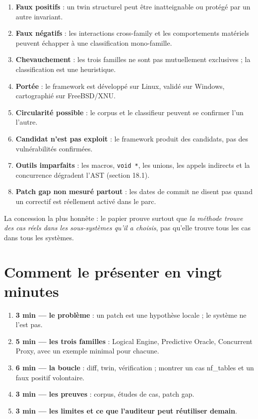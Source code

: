 \documentclass{training}
\begin{document}
\begin{enumerate}
  \item \textbf{Faux positifs} : un twin structurel peut être inatteignable ou
        protégé par un autre invariant.
  \item \textbf{Faux négatifs} : les interactions cross-family et les
        comportements matériels peuvent échapper à une classification
        mono-famille.
  \item \textbf{Chevauchement} : les trois familles ne sont pas mutuellement
        exclusives ; la classification est une heuristique.
  \item \textbf{Portée} : le framework est développé sur Linux, validé sur
        Windows, cartographié sur FreeBSD/XNU.
  \item \textbf{Circularité possible} : le corpus et le classifieur peuvent se
        confirmer l'un l'autre.
  \item \textbf{Candidat n'est pas exploit} : le framework produit des
        candidats, pas des vulnérabilités confirmées.
  \item \textbf{Outils imparfaits} : les macros, \texttt{void *}, les unions,
        les appels indirects et la concurrence dégradent l'AST (section
        18.1).
  \item \textbf{Patch gap non mesuré partout} : les dates de commit ne disent
        pas quand un correctif est réellement activé dans le parc.
\end{enumerate}

La concession la plus honnête : le papier prouve surtout que \emph{la méthode
trouve des cas réels dans les sous-systèmes qu'il a choisis}, pas qu'elle
trouve tous les cas dans tous les systèmes.

\chapter{Comment le présenter en vingt minutes}

\begin{enumerate}
  \item \textbf{3 min --- le problème} : un patch est une hypothèse locale ;
        le système ne l'est pas.
  \item \textbf{5 min --- les trois familles} : Logical Engine, Predictive
        Oracle, Concurrent Proxy, avec un exemple minimal pour chacune.
  \item \textbf{6 min --- la boucle} : diff, twin, vérification ; montrer un
        cas nf\_tables et un faux positif volontaire.
  \item \textbf{3 min --- les preuves} : corpus, études de cas, patch gap.
  \item \textbf{3 min --- les limites et ce que l'auditeur peut réutiliser
        demain}.
\end{enumerate}
\end{document}

